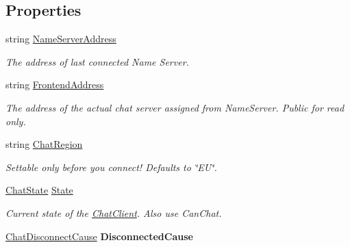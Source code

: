 \subsection*{Properties}
\begin{DoxyCompactItemize}
\item 
string \hyperlink{class_exit_games_1_1_client_1_1_photon_1_1_chat_1_1_chat_client_afc6baf1a806a9a9ea803b14889ffb8c3}{Name\+Server\+Address}
\begin{DoxyCompactList}\small\item\em The address of last connected Name Server.\end{DoxyCompactList}\item 
string \hyperlink{class_exit_games_1_1_client_1_1_photon_1_1_chat_1_1_chat_client_a4693102ef8b77518b9eed0cbbdd650e1}{Frontend\+Address}
\begin{DoxyCompactList}\small\item\em The address of the actual chat server assigned from Name\+Server. Public for read only.\end{DoxyCompactList}\item 
string \hyperlink{class_exit_games_1_1_client_1_1_photon_1_1_chat_1_1_chat_client_a5b8e2b595533f33e5c298fe5ced2726b}{Chat\+Region}
\begin{DoxyCompactList}\small\item\em Settable only before you connect! Defaults to \char`\"{}\+E\+U\char`\"{}.\end{DoxyCompactList}\item 
\hyperlink{namespace_exit_games_1_1_client_1_1_photon_1_1_chat_ad7d7f22d8741237f41e4b60779cdfa19}{Chat\+State} \hyperlink{class_exit_games_1_1_client_1_1_photon_1_1_chat_1_1_chat_client_a5d523809d52088df6fbd8927523d6238}{State}
\begin{DoxyCompactList}\small\item\em Current state of the \hyperlink{class_exit_games_1_1_client_1_1_photon_1_1_chat_1_1_chat_client}{Chat\+Client}. Also use Can\+Chat.\end{DoxyCompactList}\item 
\hyperlink{namespace_exit_games_1_1_client_1_1_photon_1_1_chat_ae3a2988c8cb1fea31bb2d9eeafc0ed8b}{Chat\+Disconnect\+Cause} {\bfseries Disconnected\+Cause}\hypertarget{class_exit_games_1_1_client_1_1_photon_1_1_chat_1_1_chat_client_a05085dc638466b2660f1c694f90fbf8e}{}\label{class_exit_games_1_1_client_1_1_photon_1_1_chat_1_1_chat_client_a05085dc638466b2660f1c694f90fbf8e}


\end{DoxyCompactItemize}
